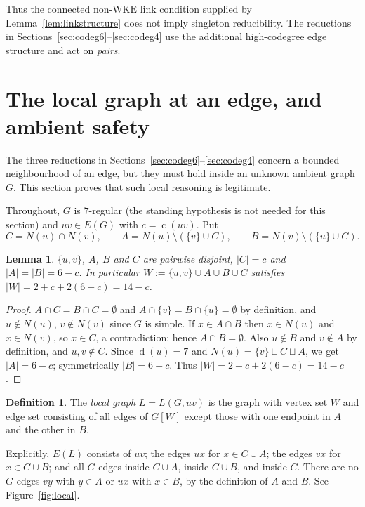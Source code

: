 \documentclass[11pt,a4paper]{amsart}
\theoremstyle{plain}
\newtheorem{lemma}[theorem]{Lemma}
\theoremstyle{definition}
\newtheorem{definition}[theorem]{Definition}
\newcommand{\WKE}{\mathrm{WKE}}
\newcommand{\cod}{\operatorname{c}}
\newcommand{\N}{N}
\newcommand{\dg}{\operatorname{d}}
\begin{document}
Thus the connected non-$\WKE$ link condition supplied by
Lemma~\ref{lem:linkstructure} does not imply singleton reducibility. The
reductions in Sections~\ref{sec:codeg6}--\ref{sec:codeg4} use the additional
high-codegree edge structure and act on \emph{pairs}.

\section{The local graph at an edge, and ambient safety}\label{sec:local}

The three reductions in Sections~\ref{sec:codeg6}--\ref{sec:codeg4} concern a
bounded neighbourhood of an edge, but they must hold inside an unknown ambient
graph $G$. This section proves that such local reasoning is legitimate.

Throughout, $G$ is $7$-regular (the standing hypothesis is not needed for this
section) and $uv\in E(G)$ with $c=\cod(uv)$. Put
\[
  C=\N(u)\cap \N(v),\qquad
  A=\N(u)\setminus(\{v\}\cup C),\qquad
  B=\N(v)\setminus(\{u\}\cup C).
\]

\begin{lemma}\label{lem:disjoint}
$\{u,v\}$, $A$, $B$ and $C$ are pairwise disjoint, $|C|=c$ and
$|A|=|B|=6-c$. In particular $W:=\{u,v\}\cup A\cup B\cup C$ satisfies
$|W|=2+c+2(6-c)=14-c$.
\end{lemma}

\begin{proof}
$A\cap C=B\cap C=\emptyset$ and $A\cap\{v\}=B\cap\{u\}=\emptyset$ by
definition, and $u\notin \N(u)$, $v\notin \N(v)$ since $G$ is simple. If
$x\in A\cap B$ then $x\in \N(u)$ and $x\in \N(v)$, so $x\in C$, a
contradiction; hence $A\cap B=\emptyset$. Also $u\notin B$ and $v\notin A$ by
definition, and $u,v\notin C$. Since $\dg(u)=7$ and
$\N(u)=\{v\}\sqcup C\sqcup A$, we get $|A|=6-c$; symmetrically $|B|=6-c$.
Thus $|W|=2+c+2(6-c)=14-c$.
\end{proof}

\begin{definition}\label{def:localgraph}
The \emph{local graph} $L=L(G,uv)$ is the graph with vertex set $W$ and edge
set consisting of all edges of $G[W]$ except those with one endpoint in $A$
and the other in $B$.
\end{definition}

Explicitly, $E(L)$ consists of $uv$; the edges $ux$ for $x\in C\cup A$; the
edges $vx$ for $x\in C\cup B$; and all $G$-edges inside $C\cup A$, inside
$C\cup B$, and inside $C$. There are no $G$-edges $vy$ with $y\in A$ or $ux$
with $x\in B$, by the definition of $A$ and $B$. See
Figure~\ref{fig:local}.
\end{document}

